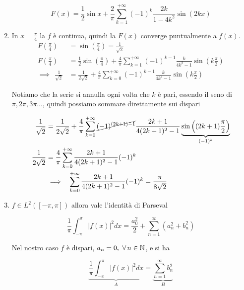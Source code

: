 \begin{enumerate}
\begin{equation*}
F(x) = \frac{1}{2}\sin x + \frac{2}{\pi }\sum ^{ + \infty }_{k = 1}(- 1)^{k}\frac{2k}{1 - 4k^{2}}\sin(2kx)
\end{equation*}
\item In $x = \frac{\pi }{4}$ la $f$ è continua, quindi la $F(x)$ converge puntualmente a $f(x)$.
\begin{align*}
F\left(\frac{\pi }{4}\right) & = \sin\left(\frac{\pi }{4}\right) = \frac{1}{\sqrt{2}}\\
F\left(\frac{\pi }{4}\right) & = \frac{1}{2}\sin\left(\frac{\pi }{4}\right) + \frac{4}{\pi }\sum ^{ + \infty }_{k = 1}(- 1)^{k - 1}\frac{k}{4k^{2} - 1}\sin\left(k\frac{\pi }{2}\right)\\
\implies \ \ \frac{1}{\sqrt{2}} & = \frac{1}{2\sqrt{2}} + \frac{4}{\pi }\sum ^{ + \infty }_{k = 0}(- 1)^{k - 1}\frac{k}{4k^{2} - 1}\sin\left(k\frac{\pi }{2}\right)
\end{align*}

Notiamo che la serie si annulla ogni volta che $k$ è pari, essendo il seno di $\pi ,2\pi ,3\pi \dotsc $, quindi possiamo sommare direttamente sui dispari

\begin{equation*}
\begin{aligned}
\frac{1}{\sqrt{2}} & = \frac{1}{2\sqrt{2}} + \frac{4}{\pi }\sum ^{ + \infty }_{k = 0}\cancel{(- 1)^{(2k + 1) - 1}}\frac{2k + 1}{4(2k + 1)^{2} - 1}\underbrace{\sin\left((2k + 1)\frac{\pi }{2}\right)}_{(- 1)^{k}}\\
\frac{1}{2\sqrt{2}} & = \frac{4}{\pi }\sum ^{ + \infty }_{k = 0}\frac{2k + 1}{4(2k + 1)^{2} - 1}(- 1)^{k}\\
 & \implies \ \ \sum ^{ + \infty }_{k = 0}\frac{2k + 1}{4(2k + 1)^{2} - 1}(- 1)^{k} = \frac{\pi }{8\sqrt{2}}
\end{aligned}
\end{equation*}
\item $f\in L^{2}([ - \pi ,\pi ])$ allora vale l'identità di Parseval

\begin{equation*}
\frac{1}{\pi }\int ^{\pi }_{ - \pi }| f(x)| ^{2} dx = \frac{a^{2}_{0}}{2} + \sum\limits ^{\infty }_{n = 1}\left(a^{2}_{n} + b^{2}_{n}\right)
\end{equation*}

Nel nostro caso $f$ è dispari, $a_{n} = 0,\ \forall n\in \NN $, e si ha

\begin{equation*}
\underbrace{\frac{1}{\pi }\int ^{\pi }_{ - \pi }| f(x)| ^{2} dx}_{A} = \underbrace{\sum\limits ^{\infty }_{n = 1} b^{2}_{n}}_{B}
\end{equation*}


\end{enumerate}
